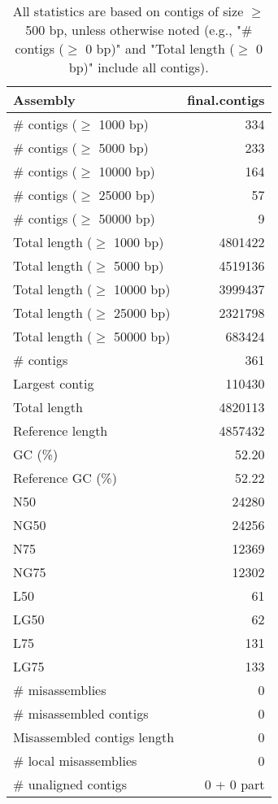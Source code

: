 \documentclass[12pt,a4paper]{article}
\begin{document}
\begin{table}[ht]
\begin{center}
\caption{All statistics are based on contigs of size $\geq$ 500 bp, unless otherwise noted (e.g., "\# contigs ($\geq$ 0 bp)" and "Total length ($\geq$ 0 bp)" include all contigs).}
\begin{tabular}{|l*{1}{|r}|}
\hline
Assembly & final.contigs \\ \hline
\# contigs ($\geq$ 1000 bp) & 334 \\ \hline
\# contigs ($\geq$ 5000 bp) & 233 \\ \hline
\# contigs ($\geq$ 10000 bp) & 164 \\ \hline
\# contigs ($\geq$ 25000 bp) & 57 \\ \hline
\# contigs ($\geq$ 50000 bp) & 9 \\ \hline
Total length ($\geq$ 1000 bp) & 4801422 \\ \hline
Total length ($\geq$ 5000 bp) & 4519136 \\ \hline
Total length ($\geq$ 10000 bp) & 3999437 \\ \hline
Total length ($\geq$ 25000 bp) & 2321798 \\ \hline
Total length ($\geq$ 50000 bp) & 683424 \\ \hline
\# contigs & 361 \\ \hline
Largest contig & 110430 \\ \hline
Total length & 4820113 \\ \hline
Reference length & 4857432 \\ \hline
GC (\%) & 52.20 \\ \hline
Reference GC (\%) & 52.22 \\ \hline
N50 & 24280 \\ \hline
NG50 & 24256 \\ \hline
N75 & 12369 \\ \hline
NG75 & 12302 \\ \hline
L50 & 61 \\ \hline
LG50 & 62 \\ \hline
L75 & 131 \\ \hline
LG75 & 133 \\ \hline
\# misassemblies & 0 \\ \hline
\# misassembled contigs & 0 \\ \hline
Misassembled contigs length & 0 \\ \hline
\# local misassemblies & 0 \\ \hline
\# unaligned contigs & 0 + 0 part \\ \hline

\end{tabular}
\end{center}
\end{table}
\end{document}
